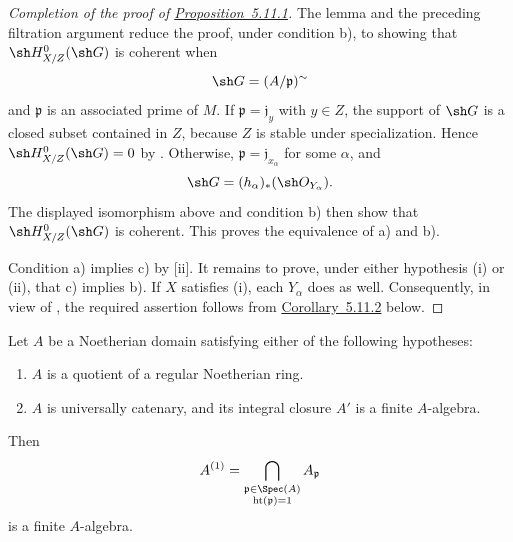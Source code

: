 \begin{proof}[Completion of the proof of {\hyperref[IV.5.11.1]{Proposition~5.11.1}}]
The lemma and the preceding filtration argument reduce the proof,
under condition {\rm b)}, to showing that
$\sh H^0_{X/Z}(\sh G)$ is coherent when
\[
  \sh G=(A/\mathfrak p)^{\sim}
\]
and $\mathfrak p$ is an associated prime of $M$.  If
$\mathfrak p=\mathfrak j_y$ with $y\in Z$, the support of
$\sh G$ is a closed subset contained in $Z$, because $Z$ is
stable under specialization.  Hence
$\sh H^0_{X/Z}(\sh G)=0$ by .  Otherwise,
$\mathfrak p=\mathfrak j_{x_\alpha}$ for some $\alpha$, and
\[
  \sh G=(h_\alpha)_*(\sh O_{Y_\alpha}).
\]
The displayed isomorphism above and condition {\rm b)} then show
that $\sh H^0_{X/Z}(\sh G)$ is coherent.  This proves the
equivalence of {\rm a)} and {\rm b)}.

Condition {\rm a)} implies {\rm c)} by
[ii].  It remains to prove, under either
hypothesis {\rm(i)} or {\rm(ii)}, that {\rm c)} implies {\rm b)}.
If $X$ satisfies {\rm(i)}, each $Y_\alpha$ does as well.
Consequently, in view of , the required
assertion follows from {\hyperref[IV.5.11.2]{Corollary~5.11.2}} below.
\end{proof}

\begin{corollary}[5.11.2]
\label{IV.5.11.2}
Let $A$ be a Noetherian domain satisfying either of the following
hypotheses:
\begin{enumerate}[{\rm(i)}]
  \item $A$ is a quotient of a regular Noetherian ring.
  \item $A$ is universally catenary, and its integral closure
  $A'$ is a finite $A$-algebra.
\end{enumerate}
Then
\[
  A^{(1)}
  =\bigcap_{\substack{\mathfrak p\in\Spec(A)\\
                      \operatorname{ht}(\mathfrak p)=1}}
    A_{\mathfrak p}
\]
is a finite $A$-algebra.
\end{corollary}

